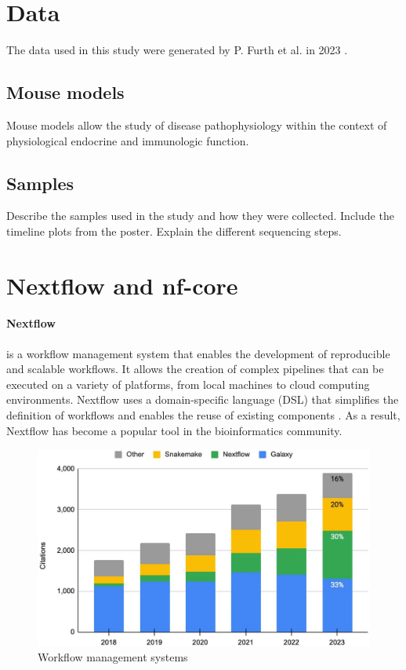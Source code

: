 \section{Data}
The data used in this study were generated by P.
Furth et al.
in 2023
\supercite{furth_esr1_2023,furth_overexpression_2023}.

\subsection{Mouse models}
Mouse models allow the study of disease pathophysiology within the context of
physiological endocrine and immunologic function.

\subsection{Samples}
Describe the samples used in the study and how they were collected.
Include the timeline plots from the poster.
Explain the different sequencing steps.

\section{Nextflow and nf-core}
\paragraph{Nextflow} is a workflow management system that enables the
development of reproducible and scalable workflows.
It allows the creation of complex pipelines that can be executed on a variety
of platforms, from local machines to cloud computing environments.
Nextflow uses a domain-specific language (DSL) that simplifies the definition
of workflows and enables the reuse of existing components
\supercite{di_tommaso_nextflow_2017}.
As a result, Nextflow has become a popular tool in the bioinformatics
community.

\begin{figure}[ht]
    \centering

    \includegraphics[width=\textwidth]{chapters/materials_and_methods/figures/nextflow_usage.jpg}
    \caption{Workflow management systems} %
    \label{fig:nextflow_usage}
\end{figure}

